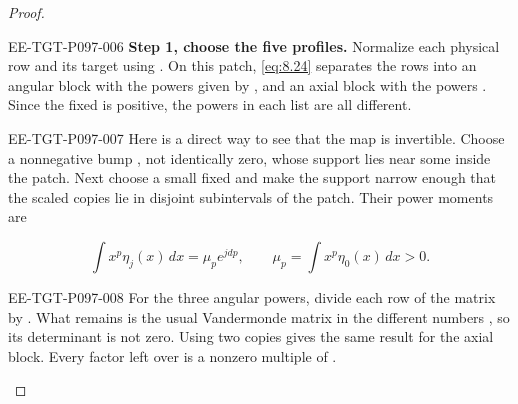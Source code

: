 \begin{proof}
\begin{EESegment}{EE-TGT-P097-006}
\textbf{Step 1, choose the five profiles.} Normalize each physical row and its target using
. On this patch, \eqref{eq:8.24} separates the rows into an angular block
with the powers  given by
, and an axial block with the powers
. Since the fixed
 is positive, the powers in each list are all different.
\end{EESegment}

\begin{EESegment}{EE-TGT-P097-007}
Here is a direct way to see that the map is invertible. Choose a nonnegative bump
, not identically zero, whose support lies near some
 inside the patch. Next choose a small fixed
 and make the support narrow enough that the scaled copies
 lie in disjoint
subintervals of the patch. Their power moments are
\end{EESegment}
\[
\int x^p\eta_j(x)\,dx=\mu_p e^{jdp},\qquad
\mu_p=\int x^p\eta_0(x)\,dx>0.
\]
\begin{EESegment}{EE-TGT-P097-008}
For the three angular powers, divide each row of the matrix by
. What remains is the usual Vandermonde matrix in the different
numbers , so its determinant is not zero. Using two copies gives the
same result for the axial block. Every factor left over is a nonzero multiple of
.
\end{EESegment}


\end{proof}
